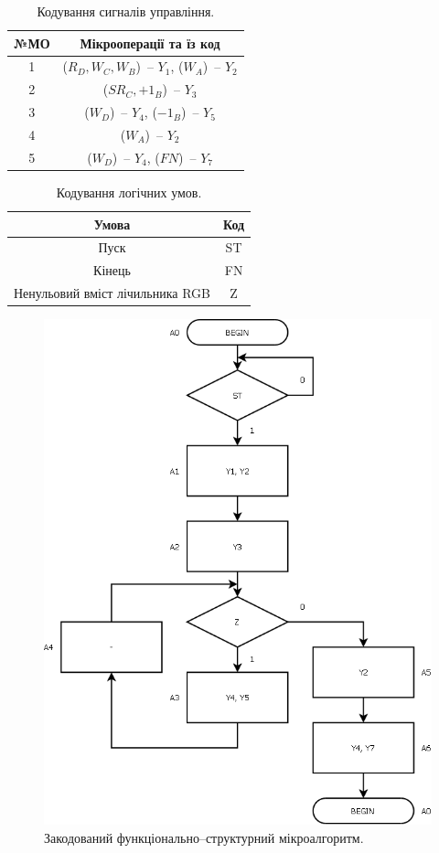 \documentclass[a4paper, 10pt]{article}
\begin{document}
\begin{table}[h!]
\centering
\begin{tabular}{|c|c|}
\hline
№МО & Мікрооперації та їз код\\
\hline
1 & ($R_D, W_C, W_B$)~-- $Y_1$, ($W_A$)~-- $Y_2$\\
\hline
2 & ($SR_C, +1_B$)~-- $Y_3$\\
\hline
3 & ($W_D$)~-- $Y_4$, ($-1_B$)~-- $Y_5$\\
\hline
4 & ($W_A$)~-- $Y_2$\\
\hline
5 & ($W_D$)~-- $Y_4$, ($FN$)~-- $Y_7$\\
\hline
\end{tabular}
\caption{Кодування сигналів управління.}
\end{table}

\begin{table}[h!]
\centering
\begin{tabular}{|c|c|}
\hline
Умова & Код\\
\hline
Пуск & ST \\
\hline
Кінець & FN\\
\hline
Ненульовий вміст лічильника RGB & Z\\
\hline
\end{tabular}
\caption{Кодування логічних умов.}
\end{table}

\begin{figure}[H]
\begin{center}
\includegraphics[scale=0.25]{fsz_alg.png}
\caption{Закодований функціонально--структурний мікроалгоритм.}
\end{center}
\end{figure}
\end{document}
